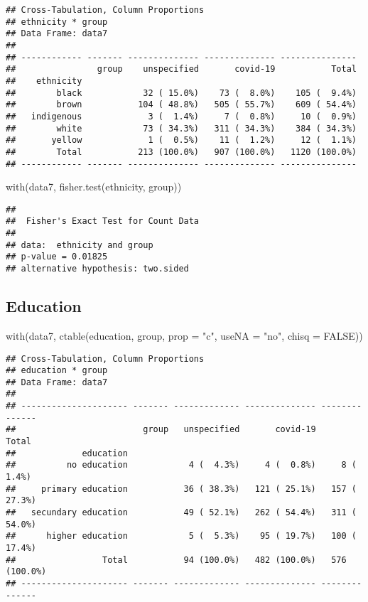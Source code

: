 \documentclass[
]{article}
\newenvironment{Shaded}{\begin{snugshade}}{\end{snugshade}}
\newcommand{\AttributeTok}[1]{\textcolor[rgb]{0.77,0.63,0.00}{#1}}
\newcommand{\ConstantTok}[1]{\textcolor[rgb]{0.00,0.00,0.00}{#1}}
\newcommand{\FunctionTok}[1]{\textcolor[rgb]{0.00,0.00,0.00}{#1}}
\newcommand{\NormalTok}[1]{#1}
\newcommand{\StringTok}[1]{\textcolor[rgb]{0.31,0.60,0.02}{#1}}
\begin{document}
\begin{verbatim}
## Cross-Tabulation, Column Proportions  
## ethnicity * group  
## Data Frame: data7  
## 
## ------------ ------- -------------- -------------- ---------------
##                group    unspecified       covid-19           Total
##    ethnicity                                                      
##        black            32 ( 15.0%)    73 (  8.0%)    105 (  9.4%)
##        brown           104 ( 48.8%)   505 ( 55.7%)    609 ( 54.4%)
##   indigenous             3 (  1.4%)     7 (  0.8%)     10 (  0.9%)
##        white            73 ( 34.3%)   311 ( 34.3%)    384 ( 34.3%)
##       yellow             1 (  0.5%)    11 (  1.2%)     12 (  1.1%)
##        Total           213 (100.0%)   907 (100.0%)   1120 (100.0%)
## ------------ ------- -------------- -------------- ---------------
\end{verbatim}

\begin{Shaded}
\begin{Highlighting}[]
\FunctionTok{with}\NormalTok{(data7, }\FunctionTok{fisher.test}\NormalTok{(ethnicity, group))}
\end{Highlighting}
\end{Shaded}

\begin{verbatim}
## 
##  Fisher's Exact Test for Count Data
## 
## data:  ethnicity and group
## p-value = 0.01825
## alternative hypothesis: two.sided
\end{verbatim}

\hypertarget{education}{%
\subsection{Education}\label{education}}

\begin{Shaded}
\begin{Highlighting}[]
\FunctionTok{with}\NormalTok{(data7, }\FunctionTok{ctable}\NormalTok{(education, group, }\AttributeTok{prop =} \StringTok{"c"}\NormalTok{, }\AttributeTok{useNA =} \StringTok{"no"}\NormalTok{, }\AttributeTok{chisq =} \ConstantTok{FALSE}\NormalTok{))}
\end{Highlighting}
\end{Shaded}

\begin{verbatim}
## Cross-Tabulation, Column Proportions  
## education * group  
## Data Frame: data7  
## 
## --------------------- ------- ------------- -------------- --------------
##                         group   unspecified       covid-19          Total
##             education                                                    
##          no education            4 (  4.3%)     4 (  0.8%)     8 (  1.4%)
##     primary education           36 ( 38.3%)   121 ( 25.1%)   157 ( 27.3%)
##   secundary education           49 ( 52.1%)   262 ( 54.4%)   311 ( 54.0%)
##      higher education            5 (  5.3%)    95 ( 19.7%)   100 ( 17.4%)
##                 Total           94 (100.0%)   482 (100.0%)   576 (100.0%)
## --------------------- ------- ------------- -------------- --------------
\end{verbatim}
\end{document}
